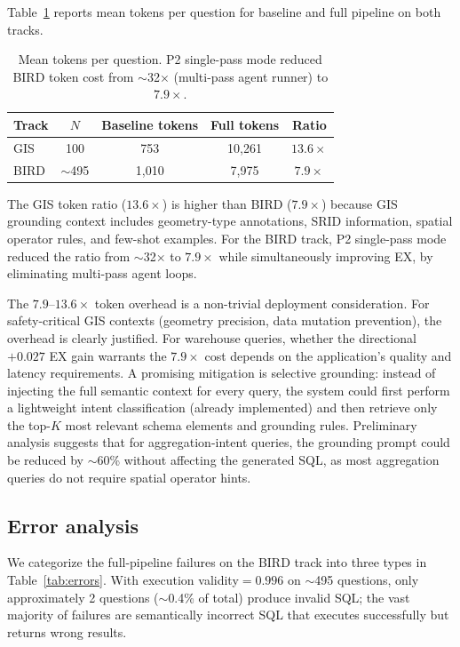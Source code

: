 \documentclass[11pt]{article}
\begin{document}
Table~\ref{tab:tokens} reports mean tokens per question for baseline and full pipeline on both tracks.

\begin{table}[t]
\centering
\caption{Mean tokens per question. P2 single-pass mode reduced BIRD token cost from $\sim$32$\times$ (multi-pass agent runner) to $7.9\times$.}
\label{tab:tokens}
\begin{tabular}{lcccc}
\toprule
Track & $N$ & Baseline tokens & Full tokens & Ratio \\
\midrule
GIS   & 100        & 753   & 10{,}261 & $13.6\times$ \\
BIRD  & $\sim$495  & 1{,}010 & 7{,}975 & $7.9\times$ \\
\bottomrule
\end{tabular}
\end{table}

The GIS token ratio ($13.6\times$) is higher than BIRD ($7.9\times$) because GIS grounding context includes geometry-type annotations, SRID information, spatial operator rules, and few-shot examples. For the BIRD track, P2 single-pass mode reduced the ratio from $\sim$32$\times$ to $7.9\times$ while simultaneously improving EX, by eliminating multi-pass agent loops.

The $7.9$--$13.6\times$ token overhead is a non-trivial deployment consideration. For safety-critical GIS contexts (geometry precision, data mutation prevention), the overhead is clearly justified. For warehouse queries, whether the directional $+0.027$ EX gain warrants the $7.9\times$ cost depends on the application's quality and latency requirements. A promising mitigation is selective grounding: instead of injecting the full semantic context for every query, the system could first perform a lightweight intent classification (already implemented) and then retrieve only the top-$K$ most relevant schema elements and grounding rules. Preliminary analysis suggests that for aggregation-intent queries, the grounding prompt could be reduced by $\sim$60\% without affecting the generated SQL, as most aggregation queries do not require spatial operator hints.

\subsection{Error analysis}
\label{sec:error}

We categorize the full-pipeline failures on the BIRD track into three types in Table~\ref{tab:errors}. With execution validity$=0.996$ on $\sim$495 questions, only approximately 2 questions ($\sim$0.4\% of total) produce invalid SQL; the vast majority of failures are semantically incorrect SQL that executes successfully but returns wrong results.
\end{document}
